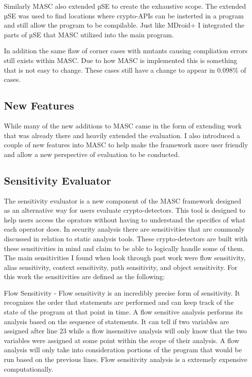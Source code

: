 Similarly MASC also extended µSE to create the exhaustive scope. The extended µSE was used to find locations where crypto-APIs can be insterted in a program and still allow the program to be compilable. Just like MDroid+ I integrated the parts of µSE that MASC utilized into the main program. 

In addition the same flaw of corner cases with mutants causing compliation errors still exists within MASC. Due to how MASC is implemented this is something that is not easy to change. These cases still have a change to appear in 0.098\% of cases.


\subsection{New Features}
\label{ch3:sec:new-features}

While many of the new additions to MASC came in the form of extending work that was already there and heavily extended the evaluation. I also introduced a couple of new features into MASC to help make the framework more user friendly and allow a new perspective of evaluation to be conducted.

\subsection{Sensitivity Evaluator}
\label{ch3:subsec:sensitities}

The sensitivity evaluator is a new component of the MASC framework designed as an alternative way for users evaluate crypto-detectors. This tool is designed to help users access the oprators without having to understand the specifics of what each operator does. In security analysis there are sensitivities that are commonly discussed in relation to static analysis tools. These crypto-detectors are built with these sensitivities in mind and claim to be able to logically handle some of them. The main sensitivities I found when look through past work were flow sensitivity, alias sensitivity, context sensitivity, path sensitivity, and object sensitivity. For this work the sensitivities are defined as the following:

Flow Sensitivity - Flow sensitivity is an incredibly precise form of sensitivity. It recognizes the order that statements are performed and can keep track of the state of the program at that point in time. A flow sensitive analysis performs its analysis based on the sequence of statements. It can tell if two variables are assigned after line 23 while a flow insensitive analysis will only know that the two variables were assigned at some point within the scope of their analysis. A flow analysis will only take into consideration portions of the program that would be run based on the previous lines. Flow sensitivity analysis is a extremely expensive computationally.


